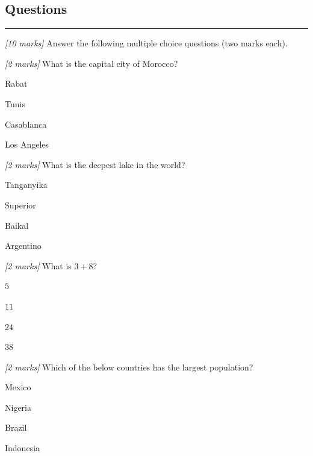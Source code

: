\documentclass{article}\usepackage[]{graphicx}\usepackage[]{xcolor}
\newif\ifmemo
\newif \ifnotmemo
\begin{document}
\renewcommand{\arraystretch}{1.0}
\newpage
\fi

\subsection*{Questions}
\vspace{-0.5cm}
\rule{15cm}{0.01cm}

\ifnotmemo\large\fi

\beq

\item \textit{[10 marks]} Answer the following multiple choice questions (two marks each).

\beq

  \item \textit{[2 marks]} What is the capital city of Morocco?

  \beq
    \item Rabat \ifmemo\textcolor{red}{Correct \tick \tick}\fi
   \item Tunis 
  \item Casablanca
  \item Los Angeles
  \eeq

  \item \textit{[2 marks]} What is the deepest lake in the world?

  \beq
  \item Tanganyika 
    \item Superior
  \item Baikal \ifmemo\textcolor{red}{Correct \tick \tick}\fi
   \item Argentino
  \eeq

  \item \textit{[2 marks]} What is $3+8$?

  \beq
    \item $5$
  \item $11$ \ifmemo\textcolor{red}{Correct \tick \tick}\fi
  \item $24$
   \item $38$
  \eeq

  \item \textit{[2 marks]} Which of the below countries has the largest population?

  \beq
  \item Mexico    
  
  \item Nigeria
  
   \item Brazil
   
   \item Indonesia \ifmemo\textcolor{red}{Correct \tick \tick}\fi
  \eeq
\end{document}
